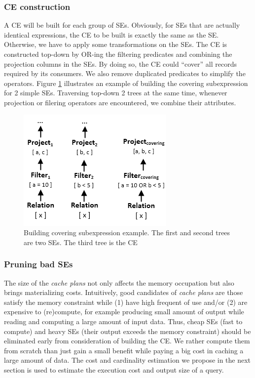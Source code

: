\subsubsection{CE construction}
\label{sec:ce-construction}
A CE will be built for each group of SEs. Obviously, for SEs that are actually identical expressions, the CE to be built is exactly the same as the SE. Otherwise, we have to apply some transformations on the SEs. The CE is constructed top-down by OR-ing the filtering predicates and combining the projection columns in the SEs. By doing so, the CE could ``cover'' all records required by its consumers. We also remove duplicated predicates to simplify the operators. Figure \ref{fig:covering} illustrates an example of building the covering subexpression for 2 simple SEs. Traversing top-down 2 trees at the same time, whenever projection or filering operators are encountered, we combine their attributes.

\begin{figure}[!htb]
	\centering
	\includegraphics[scale=0.75]{figures/covering}
	\caption{Building covering subexpression example. The first and second trees are two SEs. The third tree is the CE}
	\label{fig:covering}
\end{figure}


\subsubsection{Pruning bad SEs}
\label{sec:se-prune}
The size of the \emph{cache plans} not only affects the memory occupation but also brings materializing costs. Intuitively, good candidates of \emph{cache plans} are those satisfy the memory constraint while (1) have high frequent of use and/or (2) are expensive to (re)compute, for example producing small amount of output while reading and computing a large amount of input data. Thus, cheap SEs (fast to compute) and heavy SEs (their output exceeds the memory constraint) should be eliminated early from consideration of building the CE. We rather compute them from scratch than just gain a small benefit while paying a big cost in caching a large amount of data. The cost and cardinality estimation we propose in the next section is used to estimate the execution cost and output size of a query.

